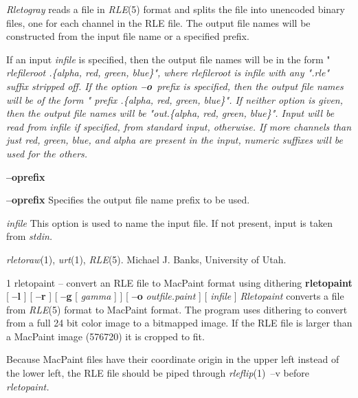 {\it Rletogray}
reads a file in
{\it RLE}{\rm (5)}
format and splits the file into unencoded binary files, one for each channel
in the RLE file.  The output file names will be constructed from the
input file name or a specified prefix.
\par
If an input 
{\it infile}
is specified, then the output file names will be in the form
"%
\it rlefileroot\rm%
.\{alpha, red, green, blue\}",
where
{\it rlefileroot}
is 
{\it infile}
with any ".rle" suffix stripped off.  If the option
{\bf --o}{\it \ prefix}
is specified, then the output file names will be of the form
"%
\it prefix\rm%
.\{alpha, red, green, blue\}".
If neither option is given, then the output file names will be 
"out.\{alpha, red, green, blue\}".
Input will be read from
{\it infile}
if specified, from standard input, otherwise.  If more channels than
just red, green, blue, and alpha are
present in the input, numeric suffixes will be used for the others.
\begin{TPlist}{{\bf --o}{\it }{\bf prefix}
}
\item[{{\bf --o}{\it }{\bf prefix}
}]
Specifies the output file name prefix to be used.
\item[{{\it infile}}]
This option is used to name the input file.  If not present, input is taken
from
{\it stdin.}
\end{TPlist}
{\it rletoraw}{\rm (1),}
{\it urt}{\rm (1),}
{\it RLE}{\rm (5).}
Michael J. Banks, University of Utah.
\newpage


%
%
%
 1
rletopaint -- convert an RLE file to MacPaint format using dithering
{\bf rletopaint}
[
{\bf --l}
] [
{\bf --r}
] [
{\bf --g}
[
{\it gamma}
]
] [
{\bf --o}
{\it outfile.paint}
] [
{\it infile} 
]
{\it Rletopaint}
converts a file from
{\it RLE}{\rm (5)}
format to MacPaint format.  The program uses 
dithering to convert from a full 24 bit color image to a bitmapped image.
If the RLE file is larger than a MacPaint image (576720) it is cropped to 
fit.

Because MacPaint files have their coordinate origin in the upper left instead
of the lower left, the RLE file should be piped through
{\it rleflip}{\rm (1)\ --v}
before 
{\it rletopaint.}

